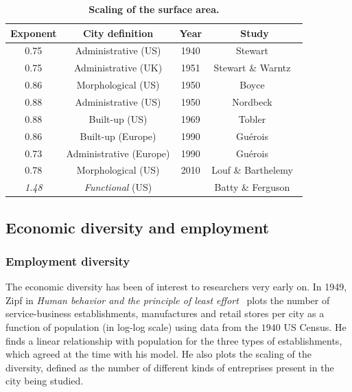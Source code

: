 \begin{table}[!h]
    \centering
\begin{tabular}{|c|c|c|c|}
\hline
Exponent & City definition & Year & Study\\
\hline
0.75 & Administrative (US) & 1940 & Stewart~\cite{Stewart:1947}\\
0.75 & Administrative (UK) & 1951 & Stewart \& Warntz~\cite{Stewart:1958}\\
0.86 & Morphological (US) & 1950 & Boyce~\cite{Boyce:1963}\\
0.88 & Administrative (US) & 1950 & Nordbeck~\cite{Nordbeck:1965}\\
0.88 & Built-up (US) & 1969 & Tobler~\cite{Tobler:1969}\\
0.86 & Built-up (Europe) & 1990 & Gu\'erois~\cite{Guerois:2003}\\
0.73 & Administrative (Europe) & 1990 & Gu\'erois~\cite{Guerois:2003}\\
0.78 & Morphological (US) & 2010 & Louf \& Barthelemy~\cite{Louf:2014_scaling}\\
\hline
\emph{1.48} & \emph{Functional} (US) & & Batty \& Ferguson~\cite{Batty:2011}\\
\hline
\end{tabular}
\caption{{\bf Scaling of the surface area.} }
\label{table:naive}
\end{table}

\subsection{Economic diversity and employment}
\label{sub:economic_diversity}

\subsubsection{Employment diversity}
\label{ssub:employment_diversity}

The economic diversity has been of interest to researchers very early on. In
1949, Zipf in \emph{Human behavior and the principle of least
effort}~\cite{Zipf:1949} plots the number of service-business establishments, manufactures and
retail stores per city as a function of population (in log-log scale) using data
from the $1940$ US Census. He finds a linear relationship with population for
the three types of establishments, which agreed at the time with his model. He
also plots the scaling of the diversity, defined as the number of different kinds of
entreprises present in the city being studied. 

